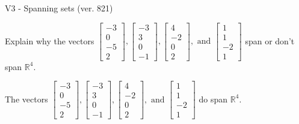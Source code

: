 \begin{exercise}
  \begin{exerciseTitle}V3 - Spanning sets (ver. 821)\end{exerciseTitle}
  \begin{exerciseStatement}
    Explain why the vectors \(\left[\begin{array}{r}
-3 \\
0 \\
-5 \\
2
\end{array}\right] , \left[\begin{array}{r}
-3 \\
3 \\
0 \\
-1
\end{array}\right] , \left[\begin{array}{r}
4 \\
-2 \\
0 \\
2
\end{array}\right] , \text{ and } \left[\begin{array}{r}
1 \\
1 \\
-2 \\
1
\end{array}\right]\) span or don't span \(\mathbb{R}^4\). 
	


  \end{exerciseStatement}
  \begin{exerciseAnswer}
   The vectors \(\left[\begin{array}{r}
-3 \\
0 \\
-5 \\
2
\end{array}\right] , \left[\begin{array}{r}
-3 \\
3 \\
0 \\
-1
\end{array}\right] , \left[\begin{array}{r}
4 \\
-2 \\
0 \\
2
\end{array}\right] , \text{ and } \left[\begin{array}{r}
1 \\
1 \\
-2 \\
1
\end{array}\right]\) 
  	 do  
	span \(\mathbb{R}^4\).
  


  \end{exerciseAnswer}
\end{exercise}